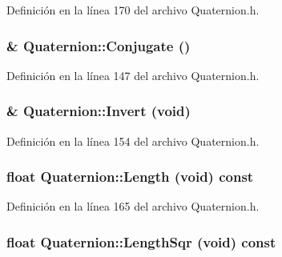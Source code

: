 Definición en la línea 170 del archivo Quaternion.h.

\hypertarget{struct_quaternion_a92dc45f84709ac09e4be54f671f75244}{
\subsubsection[{Conjugate}]{ \& Quaternion::Conjugate ()}}
\label{struct_quaternion_a92dc45f84709ac09e4be54f671f75244}


Definición en la línea 147 del archivo Quaternion.h.

\hypertarget{struct_quaternion_adf3f5e1c40394774ae7e4662bdd8c477}{
\subsubsection[{Invert}]{ \& Quaternion::Invert (void)}}
\label{struct_quaternion_adf3f5e1c40394774ae7e4662bdd8c477}


Definición en la línea 154 del archivo Quaternion.h.

\hypertarget{struct_quaternion_ade39732093b98854241519d19916310b}{
\subsubsection[{Length}]{\setlength{\rightskip}{0pt plus 5cm}float Quaternion::Length (void) const}}
\label{struct_quaternion_ade39732093b98854241519d19916310b}


Definición en la línea 165 del archivo Quaternion.h.

\hypertarget{struct_quaternion_acba07039fb1d33470dbd37f2006280ed}{
\subsubsection[{LengthSqr}]{\setlength{\rightskip}{0pt plus 5cm}float Quaternion::LengthSqr (void) const}}
\label{struct_quaternion_acba07039fb1d33470dbd37f2006280ed}


